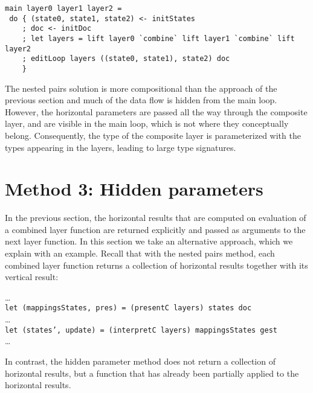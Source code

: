 \begin{small}
\begin{verbatim}
main layer0 layer1 layer2 = 
 do { (state0, state1, state2) <- initStates
    ; doc <- initDoc 
    ; let layers = lift layer0 `combine` lift layer1 `combine` lift  layer2
    ; editLoop layers ((state0, state1), state2) doc
    }
\end{verbatim}
\end{small}



The nested pairs solution is more compositional than the approach of the previous section and much of the data flow is hidden from the main loop. However, the horizontal parameters are passed all the way through the composite layer, and are visible in the main loop, which is not where they conceptually belong. Consequently, the type of the composite layer is parameterized with the types appearing in the layers, leading to large type signatures.



%																
%																
%																
\section{Method 3: Hidden parameters} \label{sect:hidden}

 
In the previous section, the horizontal results that are computed on evaluation of a combined layer function are returned explicitly and passed as arguments to the next layer function. In this section we take an alternative approach, which we explain with an example.  Recall that with the nested pairs method, each combined layer function returns a collection of horizontal results together with its vertical result:

\dots\\
{\tt  let (mappingsStates, pres) = (presentC layers) states doc }\\
\dots\\
{\tt let (states', update) = (interpretC layers) mappingsStates gest}\\
\dots

In contrast, the hidden parameter method does not return a collection of horizontal results, but a function that has already been partially applied to the horizontal results.

